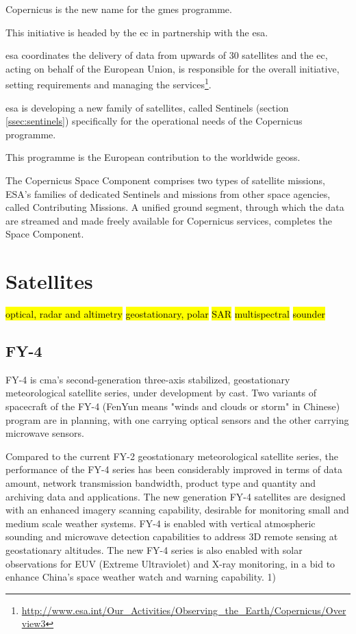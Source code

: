 \documentclass{article}
\begin{document}
Copernicus is the new name for the \ac{gmes} programme. 

This initiative is headed by the \ac{ec} in partnership with the \ac{esa}.

\ac{esa} coordinates the delivery of data from upwards of 30 satellites and the \ac{ec}, acting on behalf of the European Union, is responsible for the overall initiative, setting requirements and managing the services\footnote{\url{http://www.esa.int/Our_Activities/Observing_the_Earth/Copernicus/Overview3}}.

\ac{esa} is developing a new family of satellites, called Sentinels (section \ref{ssec:sentinels}) specifically for the operational needs of the Copernicus programme.

This programme is the European contribution to the worldwide \ac{geoss}.

The Copernicus Space Component comprises two types of satellite missions, ESA's families of dedicated Sentinels and missions from other space agencies, called Contributing Missions. A unified ground segment, through which the data are streamed and made freely available for Copernicus services, completes the Space Component.


\section{Satellites}
\label{sec:satellites}

\hl{optical, radar and altimetry}
\hl{geostationary, polar}
\hl{SAR}
\hl{multispectral}
\hl{sounder}

\subsection{FY-4}
\label{fy-4}

FY-4 is \ac{cma}'s second-generation three-axis stabilized, geostationary meteorological satellite series, under development by \ac{cast}. Two variants of spacecraft of the FY-4 (FenYun means "winds and clouds or storm" in Chinese) program are in planning, with one carrying optical sensors and the other carrying microwave sensors.

Compared to the current FY-2 geostationary meteorological satellite series, the performance of the FY-4 series has been considerably improved in terms of data amount, network transmission bandwidth, product type and quantity and archiving data and applications. The new generation FY-4 satellites are designed with an enhanced imagery scanning capability, desirable for monitoring small and medium scale weather systems. FY-4 is enabled with vertical atmospheric sounding and microwave detection capabilities to address 3D remote sensing at geostationary altitudes. The new FY-4 series is also enabled with solar observations for EUV (Extreme Ultraviolet) and X-ray monitoring, in a bid to enhance China's space weather watch and warning capability. 1)
\end{document}
